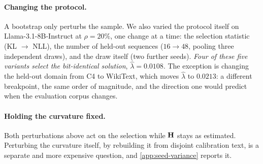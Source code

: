 \paragraph{Changing the protocol.} A bootstrap only perturbs the sample. We also varied the protocol
itself on Llama-3.1-8B-Instruct at $\rho{=}20\%$, one change at a time: the selection statistic
(KL $\rightarrow$ NLL), the number of held-out sequences ($16 \rightarrow 48$, pooling three
independent draws), and the draw itself (two further seeds). \emph{Four of these five variants select
the bit-identical solution}, $\hat\lambda = 0.0108$. The exception is changing the held-out domain
from C4 to WikiText, which moves $\hat\lambda$ to $0.0213$: a different breakpoint, the same order of
magnitude, and the direction one would predict when the evaluation corpus changes.

\paragraph{Holding the curvature fixed.} Both perturbations above act on the selection while $\mathbf{H}$
stays as estimated. Perturbing the curvature itself, by rebuilding it from disjoint calibration text,
is a separate and more expensive question, and \cref{app:seed-variance} reports it.
